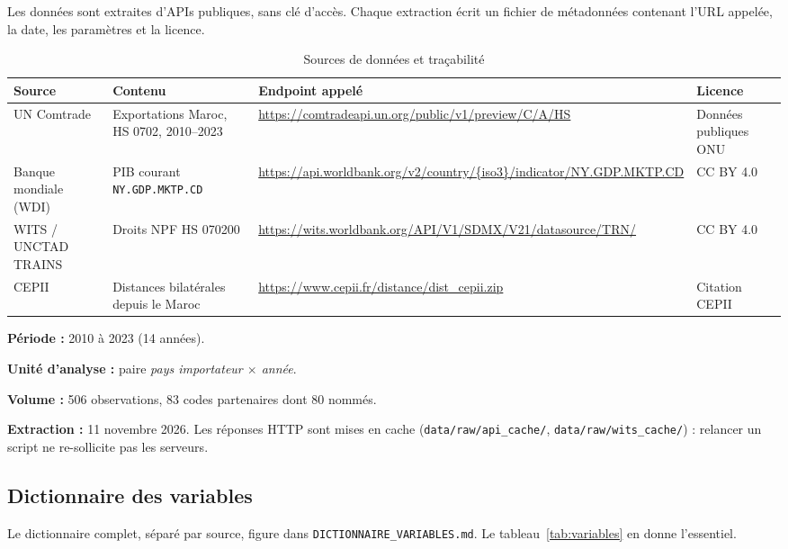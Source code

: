 \documentclass[11pt,a4paper]{article}
\begin{document}
Les données sont extraites d'APIs publiques, sans clé d'accès. Chaque extraction
écrit un fichier de métadonnées contenant l'URL appelée, la date, les paramètres et la
licence.

\begin{table}[H]
\centering
\caption{Sources de données et traçabilité}\label{tab:sources}
\scriptsize
\setlength{\tabcolsep}{4pt}
\renewcommand{\arraystretch}{1.35}
\begin{tabularx}{\textwidth}{@{}>{\raggedright\arraybackslash}p{2.1cm}
                               >{\raggedright\arraybackslash}p{3.0cm}
                               >{\raggedright\arraybackslash}X
                               >{\raggedright\arraybackslash}p{2.2cm}@{}}
\toprule
\textbf{Source} & \textbf{Contenu} & \textbf{Endpoint appelé} & \textbf{Licence} \\
\midrule
UN Comtrade & Exportations Maroc, HS 0702, 2010--2023 &
\url{https://comtradeapi.un.org/public/v1/preview/C/A/HS} &
Données publiques ONU \\
Banque mondiale (WDI) & PIB courant \texttt{NY.GDP.MKTP.CD} &
\url{https://api.worldbank.org/v2/country/{iso3}/indicator/NY.GDP.MKTP.CD} &
CC BY 4.0 \\
WITS / UNCTAD TRAINS & Droits NPF HS 070200 &
\url{https://wits.worldbank.org/API/V1/SDMX/V21/datasource/TRN/} &
CC BY 4.0 \\
CEPII & Distances bilatérales depuis le Maroc &
\url{https://www.cepii.fr/distance/dist_cepii.zip} &
Citation CEPII \\
\bottomrule
\end{tabularx}
\end{table}

\textbf{Période :} 2010 à 2023 (14 années).

\textbf{Unité d'analyse :} paire \emph{pays importateur $\times$ année}.

\textbf{Volume :} 506 observations, 83 codes partenaires dont 80 nommés.

\textbf{Extraction :} 11 novembre 2026. Les réponses HTTP sont mises en cache
(\texttt{data/raw/api\_cache/}, \texttt{data/raw/wits\_cache/}) : relancer un script ne
re-sollicite pas les serveurs.

\subsection{Dictionnaire des variables}

Le dictionnaire complet, séparé par source, figure dans
\texttt{DICTIONNAIRE\_VARIABLES.md}. Le tableau~\ref{tab:variables} en donne l'essentiel.
\end{document}
